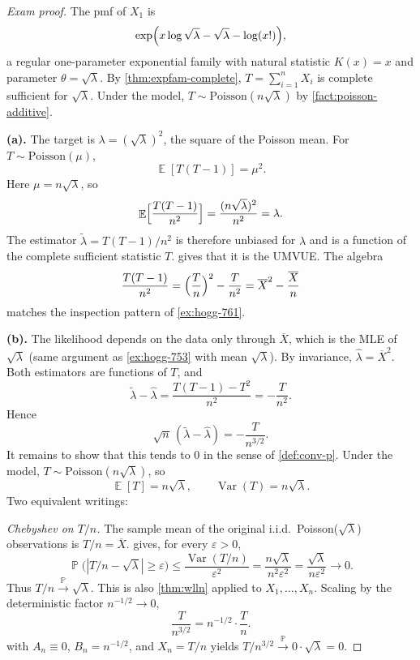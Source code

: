 \documentclass[11pt,a4paper]{article}
\DeclareMathOperator{\Var}{Var}
\DeclareMathOperator{\E}{\mathbb{E}}
\DeclareMathOperator{\Pbb}{\mathbb{P}}
\begin{document}
\begin{proof}[Exam proof]
The pmf of \(X_1\) is
\[
\exp\Bigl(x\log\sqrt{\lambda}-\sqrt{\lambda}-\log(x!)\Bigr),
\]
a regular one-parameter exponential family with natural statistic \(K(x)=x\) and parameter \(\theta=\sqrt{\lambda}\). By \cref{thm:expfam-complete}, \(T=\sum_{i=1}^{n}X_i\) is complete sufficient for \(\sqrt{\lambda}\). Under the model, \(T\sim\mathrm{Poisson}(n\sqrt{\lambda})\) by \cref{fact:poisson-additive}.

\textbf{(a).}
The target is \(\lambda=(\sqrt{\lambda})^{2}\), the square of the Poisson mean. For \(T\sim\mathrm{Poisson}(\mu)\),
\[
\E[T(T-1)]=\mu^{2}.
\]
Here \(\mu=n\sqrt{\lambda}\), so
\[
\E\Bigl[\frac{T(T-1)}{n^{2}}\Bigr]
=
\frac{(n\sqrt{\lambda})^{2}}{n^{2}}
=
\lambda.
\]
The estimator \(\tilde{\lambda}=T(T-1)/n^{2}\) is therefore unbiased for \(\lambda\) and is a function of the complete sufficient statistic \(T\).  gives that it is the UMVUE. The algebra
\[
\frac{T(T-1)}{n^{2}}
=
\Bigl(\frac{T}{n}\Bigr)^{2}-\frac{T}{n^{2}}
=
\overline{X}^{2}-\frac{\overline{X}}{n}
\]
matches the inspection pattern of \cref{ex:hogg-761}.

\textbf{(b).}
The likelihood depends on the data only through \(\overline{X}\), which is the MLE of \(\sqrt{\lambda}\) (same argument as \cref{ex:hogg-753} with mean \(\sqrt{\lambda}\)). By invariance, \(\hat{\lambda}=\overline{X}^{2}\). Both estimators are functions of \(T\), and
\[
\tilde{\lambda}-\hat{\lambda}
=
\frac{T(T-1)-T^{2}}{n^{2}}
=
-\frac{T}{n^{2}}.
\]
Hence
\[
\sqrt{n}\,(\tilde{\lambda}-\hat{\lambda})
=
-\frac{T}{n^{3/2}}.
\]
It remains to show that this tends to \(0\) in the sense of \cref{def:conv-p}. Under the model, \(T\sim\mathrm{Poisson}(n\sqrt{\lambda})\), so
\[
\E[T]=n\sqrt{\lambda},
\qquad
\Var(T)=n\sqrt{\lambda}.
\]
Two equivalent writings:

\emph{Chebyshev on \(T/n\).} The sample mean of the original i.i.d.\ Poisson(\(\sqrt{\lambda}\)) observations is \(T/n=\overline{X}\).  gives, for every \(\varepsilon>0\),
\[
\Pbb\bigl(|T/n-\sqrt{\lambda}|\ge\varepsilon\bigr)
\le
\frac{\Var(T/n)}{\varepsilon^2}
=
\frac{n\sqrt{\lambda}}{n^{2}\varepsilon^2}
=
\frac{\sqrt{\lambda}}{n\varepsilon^2}
\to 0.
\]
Thus \(T/n\xrightarrow{\Pbb}\sqrt{\lambda}\). This is also \cref{thm:wlln} applied to \(X_1,\dots,X_n\). Scaling by the deterministic factor \(n^{-1/2}\to 0\),
\[
\frac{T}{n^{3/2}}
=
n^{-1/2}\cdot\frac{T}{n}.
\]
 with \(A_n\equiv 0\), \(B_n=n^{-1/2}\), and \(X_n=T/n\) yields \(T/n^{3/2}\xrightarrow{\Pbb}0\cdot\sqrt{\lambda}=0\).


\end{proof}
\end{document}
